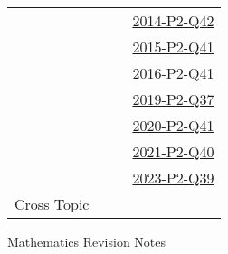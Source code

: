 \documentclass[12pt, a4paper]{article}
\begin{document}
\begin{absolutelynopagebreak}
\begin{center}
\begin{tabular}{|l|c|c|c|}
&  &  & \hyperref[DSE2014-CoreP2-Q42]{2014-P2-Q42} \\
&  &  & \hyperref[DSE2015-CoreP2-Q41]{2015-P2-Q41} \\
&  &  & \hyperref[DSE2016-CoreP2-Q41]{2016-P2-Q41} \\
&  &  & \hyperref[DSE2019-CoreP2-Q37]{2019-P2-Q37} \\
&  &  & \hyperref[DSE2020-CoreP2-Q41]{2020-P2-Q41} \\
&  &  & \hyperref[DSE2021-CoreP2-Q40]{2021-P2-Q40} \\
&  &  & \hyperref[DSE2023-CoreP2-Q39]{2023-P2-Q39} \\
\hline
\hline
Cross Topic&  &  &  \\
\hline
\end{tabular}
\end{center}
\end{absolutelynopagebreak}
\newpage
\newpage
\thispagestyle{empty}
\begin{center}
Mathematics Revision Notes\\\vspace{1cm}
\\\vspace{1cm}
{\fontsize{24pt}{24pt}\selectfont {Locus}} \\\vspace{1cm}
\label{chapter:S5-8}

\end{center}
\vspace{0.5cm}
\hline
\end{document}
